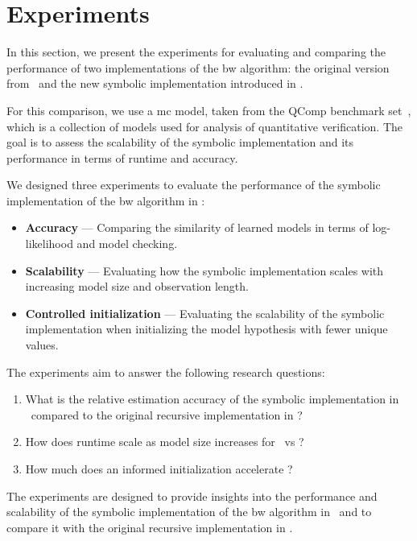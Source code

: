 \section{Experiments}\label{sec:experiments}
In this section, we present the experiments for evaluating and comparing the performance of two implementations of the \gls{bw} algorithm: the original version from \Jajapy\ and the new symbolic implementation introduced in \Cupaal.

For this comparison, we use a \gls{mc} model, taken from the QComp benchmark set~\cite{hartmanns2019quantitative}, which is a collection of models used for analysis of quantitative verification.
The goal is to assess the scalability of the symbolic implementation and its performance in terms of runtime and accuracy.

We designed three experiments to evaluate the performance of the symbolic implementation of the \gls{bw} algorithm in \Cupaal:


\begin{itemize}
    \item \textbf{Accuracy} — Comparing the similarity of learned models in terms of log-likelihood and model checking.
    \item \textbf{Scalability} — Evaluating how the symbolic implementation scales with increasing model size and observation length.
    \item \textbf{Controlled initialization} — Evaluating the scalability of the symbolic implementation when initializing the model hypothesis with fewer unique values.
\end{itemize}


The experiments aim to answer the following research questions:


\begin{enumerate}
    \item What is the relative estimation accuracy of the symbolic implementation in \Cupaal\ compared to the original recursive implementation in \Jajapy?
    \item How does runtime scale as model size increases for \Cupaal\ vs \Jajapy?
    \item How much does an informed initialization accelerate \Cupaal?
\end{enumerate}


The experiments are designed to provide insights into the performance and scalability of the symbolic implementation of the \gls{bw} algorithm in \Cupaal\ and to compare it with the original recursive implementation in \Jajapy.


